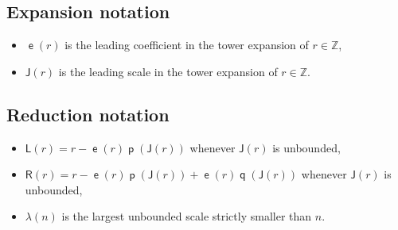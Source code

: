 \documentclass[AHL,Unicode,longabstracts,published]{cedram}
\DeclareMathOperator{\lst}{\mathsf{e}}
\DeclareMathOperator{\p}{\mathsf{p}}
\DeclareMathOperator{\q}{\mathsf{q}}
\newcommand{\Z}{\mathbb{Z}}
\newcommand{\lft}{\mathsf{L}}
\newcommand{\rht}{\mathsf{R}}
\newcommand{\scl}{\mathsf{J}}
\begin{document}
\subsection*{Expansion notation}
\begin{itemize}
\item $\lst(r)$ is the leading coefficient in the tower expansion of $r \in \Z$,
\item $\scl(r)$ is the leading scale in the tower expansion of $r \in \Z$.
\end{itemize}


\subsection*{Reduction notation}
\begin{itemize}
\item $\lft(r) = r - \lst(r) \p(\scl(r))$ whenever $\scl(r)$ is unbounded,
\item $\rht(r) = r - \lst(r) \p(\scl(r)) + \lst(r) \q(\scl(r))$ whenever $\scl(r)$ is unbounded,
\item $\lambda(n)$ is the largest unbounded scale strictly smaller than $n$.
\end{itemize}




\end{document}
